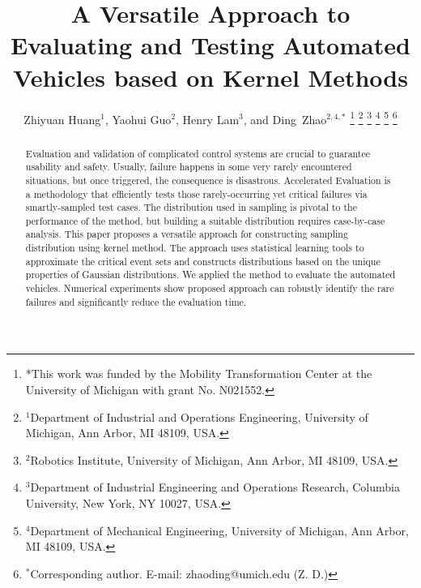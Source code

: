 \documentclass[letterpaper, 10 pt, journal]{IEEEtran}  %
\title{\LARGE \bf
A Versatile Approach to Evaluating and Testing Automated Vehicles based on Kernel Methods
}
\author{Zhiyuan Huang$^{1}$, Yaohui Guo$^{2}$, Henry Lam$^{3}$, and Ding~Zhao$^{2,4,*}$%
\thanks{*This work was funded by the Mobility Transformation Center at the University of Michigan with grant No. N021552.}%
\thanks{$^{1}$Department of Industrial and Operations Engineering, University of Michigan, Ann Arbor, MI 48109, USA.}
\thanks{$^{2}$Robotics Institute, University of Michigan, Ann Arbor, MI 48109, USA.}
\thanks{$^{3}$Department of Industrial Engineering and Operations Research, Columbia University, New York, NY 10027, USA.}
\thanks{$^{4}$Department of Mechanical Engineering, University of Michigan, Ann Arbor, MI 48109, USA.}
\thanks{$^{*}$Corresponding author. E-mail: zhaoding@umich.edu (Z. D.)}
}
\begin{document}
\maketitle
\thispagestyle{empty}
\pagestyle{empty}


\begin{abstract}


Evaluation and validation of complicated control systems are crucial to guarantee usability and safety. Usually, failure happens in some very rarely encountered situations, but once triggered, the consequence is disastrous. Accelerated Evaluation is a methodology that efficiently tests those rarely-occurring yet critical failures via smartly-sampled test cases. The distribution used in sampling is pivotal to the performance of the method, but building a suitable distribution requires case-by-case analysis. This paper proposes a versatile approach for constructing sampling distribution using kernel method. The approach uses statistical learning tools to approximate the critical event sets and constructs distributions based on the unique properties of Gaussian distributions. We applied the method to evaluate the automated vehicles. Numerical experiments show proposed approach can robustly identify the rare failures and significantly reduce the evaluation time.

\end{abstract}


\end{document}
